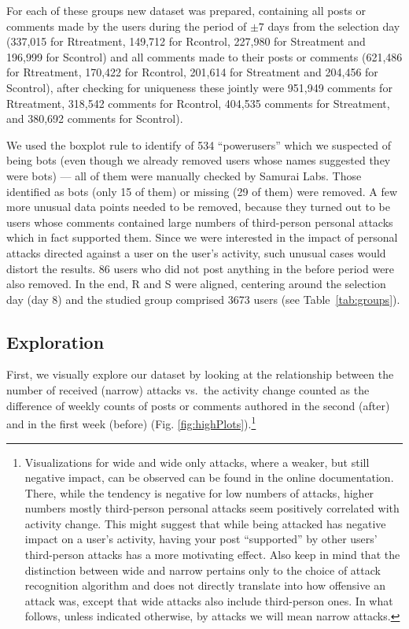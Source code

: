 \documentclass[10pt,dvipsnames]{scrartcl}
\begin{document}
For each of these groups new dataset was prepared, containing all posts
or comments made by the users during the period of \(\pm 7\) days from
the selection day (337,015 for \textsf{Rtreatment}, 149,712 for
\textsf{Rcontrol}, 227,980 for \textsf{Streatment} and 196,999 for
\textsf{Scontrol}) and all comments made to their posts or comments
(621,486 for \textsf{Rtreatment}, 170,422 for \textsf{Rcontrol}, 201,614
for \textsf{Streatment} and 204,456 for \textsf{Scontrol}), after
checking for uniqueness these jointly were 951,949 comments for
\textsf{Rtreatment}, 318,542 comments for \textsf{Rcontrol}, 404,535
comments for \textsf{Streatment}, and 380,692 comments for
\textsf{Scontrol}).

\vspace{1mm}

We used the boxplot rule to identify of 534 ``powerusers'' which we
suspected of being bots (even though we already removed users whose
names suggested they were bots) --- all of them were manually checked by
\textsf{Samurai Labs}. Those identified as bots (only 15 of them) or
missing (29 of them) were removed. A few more unusual data points needed
to be removed, because they turned out to be users whose comments
contained large numbers of third-person personal attacks which in fact
supported them. Since we were interested in the impact of personal
attacks directed against a user on the user's activity, such unusual
cases would distort the results. 86 users who did not post anything in
the \textsf{before} period were also removed. In the end, \textsf{R} and
\textsf{S} were aligned, centering around the selection day (day 8) and
the studied group comprised 3673 users (see
\mbox{Table \ref{tab:groups}}).

\subsection{Exploration}

First, we visually explore our dataset by looking at the relationship
between the number of received (narrow) attacks vs.~the activity change
counted as the difference of weekly counts of posts or comments authored
in the second (\textsf{after}) and in the first week (\textsf{before})
(Fig. \ref{fig:highPlots}).\footnote{Visualizations for \textsf{wide}
  and \textsf{wide only} attacks, where a weaker, but still negative
  impact, can be observed can be found in the online documentation.
  There, while the tendency is negative for low numbers of attacks,
  higher numbers mostly third-person personal attacks seem positively
  correlated with activity change. This might suggest that while being
  attacked has negative impact on a user's activity, having your post
  ``supported'' by other users' third-person attacks has a more
  motivating effect. Also keep in mind that the distinction between wide
  and narrow pertains only to the choice of attack recognition algorithm
  and does not directly translate into how offensive an attack was,
  except that \textsf{wide} attacks also include third-person ones. In
  what follows, unless indicated otherwise, by attacks we will mean
  narrow attacks.}
\end{document}
